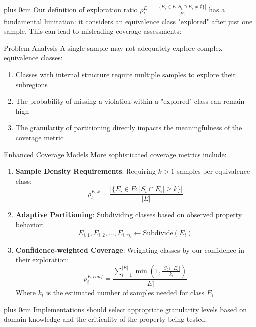 \documentclass[11pt,a4paper]{article}
\newcommand{\justifytext}{\leftskip=0pt \rightskip=0pt plus 0cm}
\begin{document}
\justifytext
Our definition of exploration ratio $\rho_t^E = \frac{|\{E_i \in E : S_t \cap E_i \neq \emptyset\}|}{|E|}$ has a fundamental limitation: it considers an equivalence class "explored" after just one sample. This can lead to misleading coverage assessments:

\begin{alertbox}{Problem Analysis}
A single sample may not adequately explore complex equivalence classes:
\begin{enumerate}
\item Classes with internal structure require multiple samples to explore their subregions
\item The probability of missing a violation within a "explored" class can remain high
\item The granularity of partitioning directly impacts the meaningfulness of the coverage metric
\end{enumerate}
\end{alertbox}

\begin{alertbox}{Enhanced Coverage Models}
More sophisticated coverage metrics include:
\begin{enumerate}
\item \textbf{Sample Density Requirements}: Requiring $k > 1$ samples per equivalence class:
   \begin{equation}
   \rho_t^{E,k} = \frac{|\{E_i \in E : |S_t \cap E_i| \geq k\}|}{|E|}
   \end{equation}

\item \textbf{Adaptive Partitioning}: Subdividing classes based on observed property behavior:
   \begin{equation}
   E_{i,1}, E_{i,2}, ..., E_{i,m_i} \leftarrow \text{Subdivide}(E_i)
   \end{equation}
   
\item \textbf{Confidence-weighted Coverage}: Weighting classes by our confidence in their exploration:
   \begin{equation}
   \rho_t^{E,conf} = \frac{\sum_{i=1}^{|E|} \min(1, \frac{|S_t \cap E_i|}{k_i})}{|E|}
   \end{equation}
   Where $k_i$ is the estimated number of samples needed for class $E_i$
\end{enumerate}
\end{alertbox}

\justifytext
Implementations should select appropriate granularity levels based on domain knowledge and the criticality of the property being tested.
\end{document}

